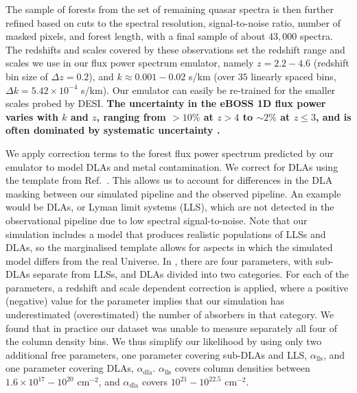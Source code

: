 The sample of \lya forests from the set of remaining quasar spectra is then further refined based on cuts to the spectral resolution, signal-to-noise ratio, number of masked pixels, and forest length, with a final sample of about $43,000$ spectra.
The redshifts and scales covered by these observations set the redshift range and scales we use in our flux power spectrum emulator, namely $z=2.2-4.6$ (redshift bin size of $\Delta z = 0.2$), and $k\approx0.001-0.02$ s/km (over $35$ linearly spaced bins, $\Delta k = 5.42\times10^{-4}$ s/km).
Our emulator can easily be re-trained for the smaller scales probed by DESI.
\textbf{The uncertainty in the eBOSS 1D flux power varies with $k$ and $z$, ranging from $> 10 \%$ at $z > 4$ to $\sim 2\%$ at $z \leq 3$, and is often dominated by systematic uncertainty \cite{2019JCAP...07..017C}.}

We apply correction terms to the \lya forest flux power spectrum predicted by our emulator to model DLAs and metal contamination.
We correct for DLAs using the template from Ref.~\cite{2018MNRAS.474.3032R}. This allows us to account for differences in the DLA masking between our simulated pipeline and the observed pipeline.
An example would be DLAs, or Lyman limit systems (LLS), which are not detected in the observational pipeline due to low spectral signal-to-noise.
Note that our simulation includes a model that produces realistic populations of LLSs and DLAs, so the marginalised template allows for aspects in which the simulated model differs from the real Universe.
In \cite{2018MNRAS.474.3032R}, there are four parameters, with sub-DLAs separate from LLSs, and DLAs divided into two categories.
For each of the parameters, a redshift and scale dependent correction is applied, where a positive (negative) value for the parameter implies that our simulation has underestimated (overestimated) the number of absorbers in that category. 
We found that in practice our dataset was unable to measure separately all four of the column density bins.
We thus simplify our likelihood by using only two additional free parameters, one parameter covering sub-DLAs and LLS, $\alpha_{\mathrm{lls}}$, and one parameter covering DLAs, $\alpha_{\mathrm{dla}}$.
$\alpha_{\mathrm{lls}}$ covers column densities between $1.6\times10^{17} - 10^{20}$ cm$^{-2}$, and $\alpha_{\mathrm{dla}}$ covers $10^{21}-10^{22.5}$  cm$^{-2}$. 

